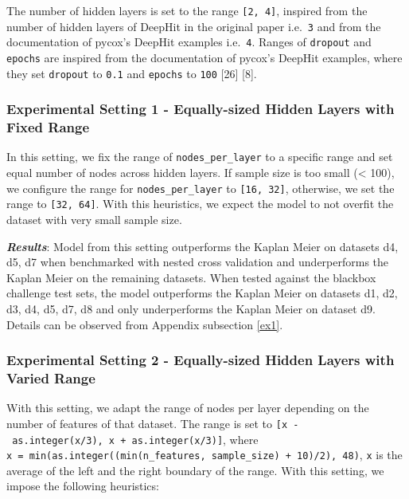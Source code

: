 \documentclass[
]{article}
\begin{document}
The number of hidden layers is set to the range \texttt{{[}2,\ 4{]}}, inspired from the number of hidden layers of DeepHit in the original paper i.e.~\texttt{3} and from the documentation of pycox's DeepHit examples i.e.~\texttt{4}. Ranges of \texttt{dropout} and \texttt{epochs} are inspired from the documentation of pycox's DeepHit examples, where they set \texttt{dropout} to \texttt{0.1} and \texttt{epochs} to \texttt{100} {[}26{]} {[}8{]}.

\hypertarget{experimental-setting-1---equally-sized-hidden-layers-with-fixed-range}{%
\subsubsection{Experimental Setting 1 - Equally-sized Hidden Layers with Fixed Range}\label{experimental-setting-1---equally-sized-hidden-layers-with-fixed-range}}

In this setting, we fix the range of \texttt{nodes\_per\_layer} to a specific range and set equal number of nodes across hidden layers. If sample size is too small (\textless{} 100), we configure the range for \texttt{nodes\_per\_layer} to \texttt{{[}16,\ 32{]}}, otherwise, we set the range to \texttt{{[}32,\ 64{]}}. With this heuristics, we expect the model to not overfit the dataset with very small sample size.

\textbf{\emph{Results}}: Model from this setting outperforms the Kaplan Meier on datasets d4, d5, d7 when benchmarked with nested cross validation and underperforms the Kaplan Meier on the remaining datasets. When tested against the blackbox challenge test sets, the model outperforms the Kaplan Meier on datasets d1, d2, d3, d4, d5, d7, d8 and only underperforms the Kaplan Meier on dataset d9. Details can be observed from Appendix subsection \ref{ex1}.

\hypertarget{experimental-setting-2---equally-sized-hidden-layers-with-varied-range}{%
\subsubsection{Experimental Setting 2 - Equally-sized Hidden Layers with Varied Range}\label{experimental-setting-2---equally-sized-hidden-layers-with-varied-range}}

With this setting, we adapt the range of nodes per layer depending on the number of features of that dataset. The range is set to \texttt{{[}x\ -\ as.integer(x/3),\ x\ +\ as.integer(x/3){]}}, where \texttt{x\ =\ min(as.integer((min(n\_features,\ sample\_size)\ +\ 10)/2),\ 48)}, \texttt{x} is the average of the left and the right boundary of the range. With this setting, we impose the following heuristics:
\vspace{-0.5cm}
\end{document}
